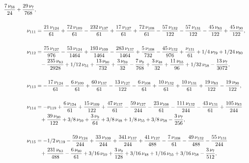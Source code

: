 \documentclass[a4paper,12pt, DIV=14, BCOR=5mm, twoside, headsepline, numbers=noenddot]{scrbook}
\begin{document}
\begin{align}
\begin{aligned}
{\frac {7\,\nu_{{58}}}{24}}+{\frac {29\,\nu_{{7}}}{768}}, \\
\\
\nu_{{111}}&={
\frac {21\,\nu_{{124}}}{61}}+{\frac {72\,\nu_{{109}}}{61}}-{\frac {232
\,\nu_{{137}}}{61}}+{\frac {17\,\nu_{{127}}}{61}}+{\frac {72\,\nu_{{
108}}}{61}}-{\frac {57\,\nu_{{132}}}{122}}-{\frac {57\,\nu_{{131}}}{
122}}-{\frac {45\,\nu_{{83}}}{122}}+{\frac {45\,\nu_{{90}}}{122}}, \\
\\
\nu_
{{112}}&={\frac {75\,\nu_{{127}}}{976}}-{\frac {53\,\nu_{{124}}}{1464}}
+{\frac {193\,\nu_{{109}}}{1464}}-{\frac {283\,\nu_{{137}}}{1464}}+{
\frac {5\,\nu_{{108}}}{732}}-{\frac {45\,\nu_{{132}}}{976}}+{\frac {
\nu_{{131}}}{61}}+1/4\,\nu_{{79}}+1/24\,\nu_{{80}}\\
 &\hphantom{=}-{\frac {235\,\nu_{{
83}}}{2928}}+1/12\,\nu_{{51}}+{\frac {13\,\nu_{{90}}}{732}}+{\frac {3
\,\nu_{{59}}}{32}}-{\frac {7\,\nu_{{9}}}{768}}+{\frac {3\,\nu_{{48}}}{
32}}+{\frac {11\,\nu_{{55}}}{96}}+1/32\,\nu_{{58}}-{\frac {13\,\nu_{{7
}}}{3072}}, \\
\\
\nu_{{113}}&=-{\frac {17\,\nu_{{124}}}{61}}-{\frac {6\,\nu_{
{109}}}{61}}+{\frac {60\,\nu_{{137}}}{61}}-{\frac {13\,\nu_{{127}}}{
122}}-{\frac {6\,\nu_{{108}}}{61}}+{\frac {10\,\nu_{{132}}}{61}}+{
\frac {10\,\nu_{{131}}}{61}}+{\frac {19\,\nu_{{83}}}{122}}-{\frac {19
\,\nu_{{90}}}{122}},\\
\\
\nu_{{114}}&=-\nu_{{119}}+{\frac {6\,\nu_{{124}}}{
61}}+{\frac {15\,\nu_{{109}}}{122}}+{\frac {47\,\nu_{{137}}}{61}}-{
\frac {59\,\nu_{{127}}}{244}}-{\frac {23\,\nu_{{108}}}{61}}-{\frac {
111\,\nu_{{132}}}{244}}-{\frac {43\,\nu_{{131}}}{61}}+{\frac {105\,\nu
_{{83}}}{244}}\\
 &\hphantom{=}+{\frac {39\,\nu_{{90}}}{122}}+3/8\,\nu_{{59}}+{\frac {3
\,\nu_{{9}}}{64}}+3/8\,\nu_{{48}}+1/8\,\nu_{{55}}+3/8\,\nu_{{58}}-{
\frac {3\,\nu_{{7}}}{256}}, \\
\\
\nu_{{115}}&=-1/2\,\nu_{{119}}-{\frac {59\,
\nu_{{124}}}{244}}+{\frac {33\,\nu_{{109}}}{244}}+{\frac {341\,\nu_{{
137}}}{244}}+{\frac {41\,\nu_{{127}}}{488}}-{\frac {7\,\nu_{{108}}}{61
}}-{\frac {49\,\nu_{{132}}}{488}}-{\frac {55\,\nu_{{131}}}{244}}\\
 &\hphantom{=}+{
\frac {231\,\nu_{{83}}}{488}}-{\frac {6\,\nu_{{90}}}{61}}+3/16\,\nu_{{
59}}+{\frac {3\,\nu_{{9}}}{128}}+3/16\,\nu_{{48}}+1/16\,\nu_{{55}}+3/
16\,\nu_{{58}}-{\frac {3\,\nu_{{7}}}{512}},
\end{aligned}
\end{align}
\end{document}
